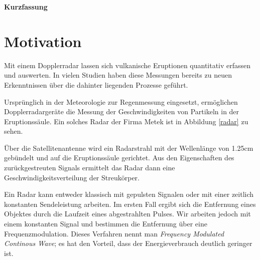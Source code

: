 \documentclass[12pt,a4paper,twoside,BCOR=12.5mm]{scrartcl}
\begin{document}
\begin{center}\textbf{Kurzfassung} \end{center}
\thispagestyle{empty}



\cleardoublepage
\newpage

\tableofcontents
\thispagestyle{empty}



\cleardoublepage
\newpage 
\setcounter{page}{1}
\section{Motivation}

Mit einem Dopplerradar lassen sich vulkanische Eruptionen quantitativ erfassen und auswerten. In vielen Studien haben diese Messungen bereits zu neuen Erkenntnissen über die dahinter liegenden Prozesse geführt. 

Ursprünglich in der Meteorologie zur Regenmessung eingesetzt, ermöglichen Dopplerradargeräte die Messung der Geschwindigkeiten von Partikeln in der Eruptionssäule. Ein solches Radar der Firma Metek ist in Abbildung \ref{radar} zu sehen.

Über die Satellitenantenne wird ein Radarstrahl mit der Wellenlänge von 1.25cm gebündelt und auf die Eruptionssäule gerichtet.
Aus den Eigenschaften des zurückgestreuten Signals ermittelt das Radar dann eine Geschwindigkeitsverteilung der Streukörper. 

Ein Radar kann entweder klassisch mit gepulsten Signalen oder mit einer zeitlich konstanten Sendeleistung arbeiten.
Im ersten Fall ergibt sich die Entfernung eines Objektes durch die Laufzeit eines abgestrahlten Pulses. 
Wir arbeiten jedoch mit einem konstanten Signal und bestimmen die Entfernung über eine Frequenzmodulation. Dieses Verfahren nennt man \textit{Frequency Modulated Continous Wave}; es hat den Vorteil, dass der Energieverbrauch deutlich geringer ist.
\end{document}
